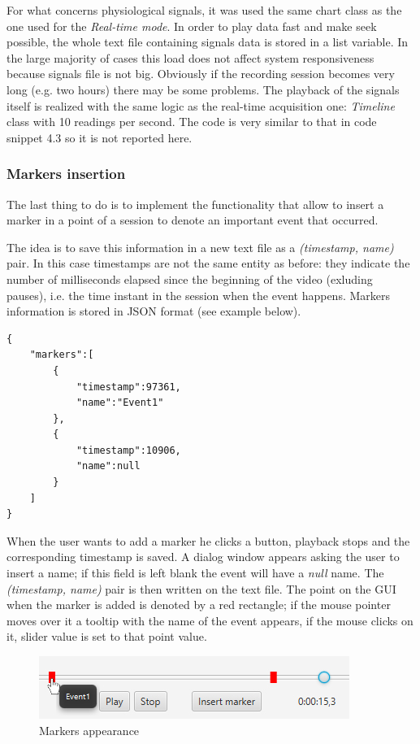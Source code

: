 \documentclass[binding=0.6cm,LaM]{sapthesis}
\begin{document}
For what concerns physiological signals, it was used the same chart class as the one used for the \textit{Real-time mode}. In order to play data fast and make seek possible, the whole text file containing signals data is stored in a list variable. In the large majority of cases this load does not affect system responsiveness because signals file is not big. Obviously if the recording session becomes very long (e.g. two hours) there may be some problems. The playback of the signals itself is realized with the same logic as the real-time acquisition one: \textit{Timeline} class with 10 readings per second. The code is very similar to that in code snippet 4.3 so it is not reported here.

\subsubsection{Markers insertion}
The last thing to do is to implement the functionality that allow to insert a marker in a point of a session to denote an important event that occurred.

The idea is to save this information in a new text file as a \textit{(timestamp, name)} pair. In this case timestamps are not the same entity as before: they indicate the number of milliseconds elapsed since the beginning of the video (exluding pauses), i.e. the time instant in the session when the event happens. Markers information is stored in JSON format (see example below).

\begin{lstlisting}[caption={Markers file example}, captionpos=b]
{
	"markers":[
		{
			"timestamp":97361,
			"name":"Event1"
		},
		{
			"timestamp":10906,
			"name":null
		}
	]
}
\end{lstlisting}


When the user wants to add a marker he clicks a button, playback stops and the corresponding timestamp is saved. A dialog window appears asking the user to insert a name; if this field is left blank the event will have a \textit{null} name. The \textit{(timestamp, name)} pair is then written on the text file. The point on the GUI when the marker is added is denoted by a red rectangle; if the mouse pointer moves over it a tooltip with the name of the event appears, if the mouse clicks on it, slider value is set to that point value.

\begin{figure}[h]
\centering
\includegraphics[scale=.8]{images/markers}
\caption{Markers appearance}
\end{figure}
\end{document}
